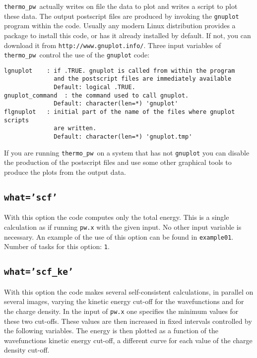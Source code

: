 \documentclass[12pt,a4paper]{article}
\def\thermo{\texttt{thermo\_pw}}
\begin{document}
\thermo\ actually writes on file the data to plot and writes a script to plot
these data. The output postscript files are produced by invoking the 
\texttt{gnuplot} program within the code. Usually any modern Linux 
distribution provides a package to install this code, or has it already 
installed by default. If not, you can download it from 
\texttt{http://www.gnuplot.info/}. Three input variables of \thermo\ control 
the use of the \texttt{gnuplot} code:

\begin{verbatim}
lgnuplot    : if .TRUE. gnuplot is called from within the program
              and the postscript files are immediately available
              Default: logical .TRUE.
gnuplot_command  : the command used to call gnuplot.
              Default: character(len=*) 'gnuplot'
flgnuplot   : initial part of the name of the files where gnuplot scripts 
              are written.
              Default: character(len=*) 'gnuplot.tmp'
\end{verbatim}
If you are running \thermo\ on a system that has not \texttt{gnuplot}
you can disable the production of the postscript files and use some other
graphical tools to produce the plots from the output data. 


\subsection{\texttt{what='scf'}}
With this option the code computes only the total energy. This is a single
calculation as if running \texttt{pw.x} with the given input.
No other input variable is necessary.
An example of the use of this option can be found in \texttt{example01}. \\
Number of tasks for this option: \texttt{1}.

\subsection{\texttt{what='scf\_ke'}}
With this option the code makes several self-consistent calculations, 
in parallel on several images, varying the kinetic energy cut-off for 
the wavefunctions and for the charge density. 
In the input of \texttt{pw.x} one specifies the minimum values for these two 
cut-offs. These values are then increased in fixed intervals controlled by the 
following variables. The energy is then plotted as a function of the 
wavefunctions kinetic energy cut-off, a different curve for each value of 
the charge density cut-off.
\end{document}
